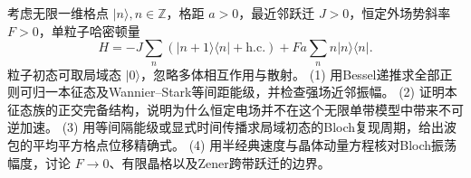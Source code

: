 考虑无限一维格点 \(|n\rangle,n\in\mathbb Z\)，格距 \(a>0\)，最近邻跃迁 \(J>0\)，恒定外场势斜率 \(F>0\)，单粒子哈密顿量
\[
H=-J\sum_n(|n+1\rangle\langle n|+\mathrm{h.c.})+Fa\sum_n n|n\rangle\langle n|.
\]
粒子初态可取局域态 \(|0\rangle\)，忽略多体相互作用与散射。
(1) 用Bessel递推求全部正则可归一本征态及Wannier–Stark等间距能级，并检查强场近邻振幅。
(2) 证明本征态族的正交完备结构，说明为什么恒定电场并不在这个无限单带模型中带来不可逆加速。
(3) 用等间隔能级或显式时间传播求局域初态的Bloch复现周期，给出波包的平均平方格点位移精确式。
(4) 用半经典速度与晶体动量方程核对Bloch振荡幅度，讨论 \(F\to0\)、有限晶格以及Zener跨带跃迁的边界。
